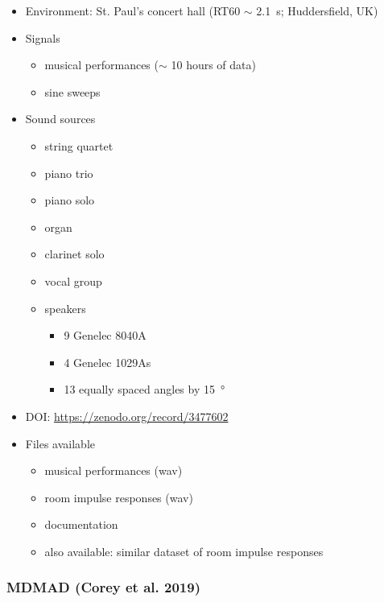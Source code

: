 \documentclass[14pt, oneside]{extarticle}
\begin{document}
\begin{itemize}
\item Environment: St. Paul's concert hall (RT60 $\sim$ \SI{2.1}{\second}; Huddersfield, UK)

\item Signals
	\begin{itemize}
	\item musical performances ($\sim$ 10 hours of data)
	\item sine sweeps
	\end{itemize}

\item Sound sources
	\begin{itemize}
	\item string quartet
	\item piano trio
	\item piano solo
	\item organ
	\item clarinet solo
	\item vocal group
	\item speakers
		\begin{itemize}
		\item 9 Genelec 8040A
		\item 4 Genelec 1029As
		\item 13 equally spaced angles by \SI{15}{\degree}
		\end{itemize}
	\end{itemize}

\item DOI: \href{10.5281/zenodo.3477602}{https://zenodo.org/record/3477602} 

\item Files available
	\begin{itemize}
	\item musical performances (wav)
	\item room impulse responses (wav)
	\item documentation
	\item also available: similar dataset of room impulse responses \cite{lee2017microphone}
	\end{itemize}

\end{itemize}

\subsubsection{MDMAD (Corey et al. 2019)}
\end{document}
